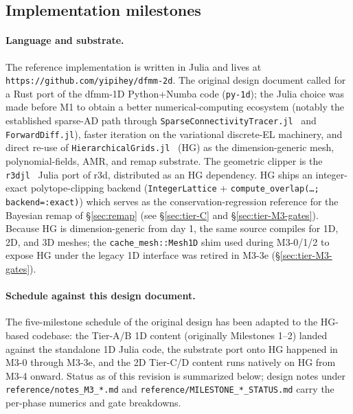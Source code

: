 \documentclass[11pt]{article}
\begin{document}
\subsection{Implementation milestones}
\label{sec:milestones}

\paragraph{Language and substrate.} The reference implementation is
written in Julia and lives at
\texttt{https://github.com/yipihey/dfmm-2d}. The original design
document called for a Rust port of the dfmm-1D Python+Numba code
(\texttt{py-1d}); the Julia choice was made before M1 to obtain a
better numerical-computing ecosystem (notably the established
sparse-AD path through
\texttt{SparseConnectivityTracer.jl}~\cite{sct-paper} and
\texttt{ForwardDiff.jl}), faster iteration on the variational
discrete-EL machinery, and direct re-use of
\texttt{HierarchicalGrids.jl}~\cite{hg-paper} (HG) as the
dimension-generic mesh, polynomial-fields, AMR, and remap substrate.
The geometric clipper is the \texttt{r3djl}~\cite{r3djl-paper} Julia
port of r3d, distributed as an HG dependency. HG ships an
integer-exact polytope-clipping backend
(\texttt{IntegerLattice} + \texttt{compute\_overlap(\dots;
backend=:exact)}) which serves as the conservation-regression
reference for the Bayesian remap of \S\ref{sec:remap} (see
\S\ref{sec:tier-C} and \S\ref{sec:tier-M3-gates}). Because HG is
dimension-generic from day 1, the same source compiles for 1D, 2D,
and 3D meshes; the \texttt{cache\_mesh::Mesh1D} shim used during
M3-0/1/2 to expose HG under the legacy 1D interface was retired in
M3-3e (\S\ref{sec:tier-M3-gates}).

\paragraph{Schedule against this design document.} The five-milestone
schedule of the original design has been adapted to the HG-based
codebase: the Tier-A/B 1D content (originally Milestones 1--2)
landed against the standalone 1D Julia code, the substrate port onto
HG happened in M3-0 through M3-3e, and the 2D Tier-C/D content
runs natively on HG from M3-4 onward. Status as of this revision
is summarized below; design notes under
\verb|reference/notes_M3_*.md| and
\verb|reference/MILESTONE_*_STATUS.md| carry the per-phase numerics
and gate breakdowns.
\end{document}
